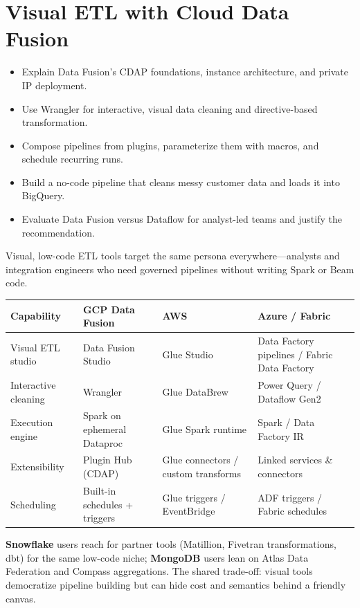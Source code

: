 \chapter{Visual ETL with Cloud Data Fusion}

\begin{objectives}
\begin{itemize}
    \item Explain Data Fusion's CDAP foundations, instance architecture, and private IP deployment.
    \item Use Wrangler for interactive, visual data cleaning and directive-based transformation.
    \item Compose pipelines from plugins, parameterize them with macros, and schedule recurring runs.
    \item Build a no-code pipeline that cleans messy customer data and loads it into BigQuery.
    \item Evaluate Data Fusion versus Dataflow for analyst-led teams and justify the recommendation.
\end{itemize}
\end{objectives}

\begin{crosscloud}
Visual, low-code ETL tools target the same persona everywhere---analysts and integration engineers who need governed pipelines without writing Spark or Beam code.

\vspace{2mm}
{\footnotesize
\begin{tabular}{@{}p{2.8cm}p{3.0cm}p{3.0cm}p{3.0cm}@{}} \\
\toprule
\textbf{Capability} & \textbf{GCP Data Fusion} & \textbf{AWS} & \textbf{Azure / Fabric} \\
\midrule
Visual ETL studio & Data Fusion Studio & Glue Studio & Data Factory pipelines / Fabric Data Factory \\
Interactive cleaning & Wrangler & Glue DataBrew & Power Query / Dataflow Gen2 \\
Execution engine & Spark on ephemeral Dataproc & Glue Spark runtime & Spark / Data Factory IR \\
Extensibility & Plugin Hub (CDAP) & Glue connectors / custom transforms & Linked services \& connectors \\
Scheduling & Built-in schedules + triggers & Glue triggers / EventBridge & ADF triggers / Fabric schedules \\
\bottomrule
\end{tabular}}

\vspace{1mm}
\textbf{Snowflake} users reach for partner tools (Matillion, Fivetran transformations, dbt) for the same low-code niche; \textbf{MongoDB} users lean on Atlas Data Federation and Compass aggregations. The shared trade-off: visual tools democratize pipeline building but can hide cost and semantics behind a friendly canvas.
\end{crosscloud}

